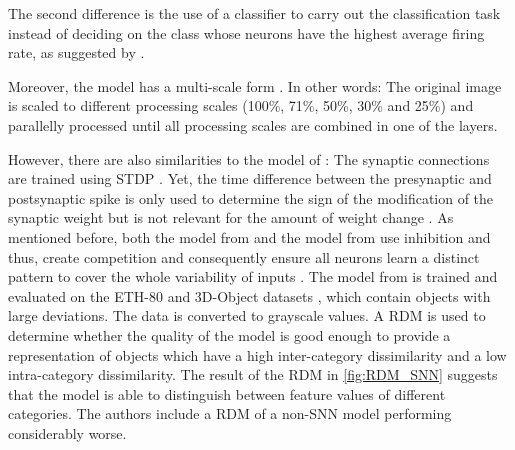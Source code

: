 The second difference is the use of a classifier to carry out the classification task 
instead of deciding on the class whose neurons have the highest average firing rate, 
as suggested by \authorsSNN{} \cite{SNN}.

Moreover, the model has a multi-scale form \cite{multi_scale_STDP}.
In other words: 
The original image is scaled to different processing scales (100\%, 71\%, 50\%, 30\% and 25\%) and parallelly processed until 
all processing scales are combined in one of the layers.

However, there are also similarities to the model of \authorsSNN{} \cite{SNN}:
The synaptic connections are trained using \ac{STDP} \cite{multi_scale_STDP,STDP_vis_feat}.
Yet, the time difference between the presynaptic and postsynaptic spike is only used to determine the sign of the modification of the synaptic weight 
but is not relevant for the amount of weight change \cite{STDP_vis_feat}.
As mentioned before, both the model from \authorsmultiScaleSTDP{} \cite{multi_scale_STDP} and the model from \authorsSNN{} \cite{SNN} use inhibition and thus, 
create competition and consequently ensure all neurons learn a distinct pattern to cover the whole variability of inputs \cite{STDP_vis_feat}.
%
The model from \authorsmultiScaleSTDP{} \cite{multi_scale_STDP} is trained and evaluated on the ETH-80 and 3D-Object datasets \cite{multi_scale_STDP}, which contain objects with large deviations.
The data is converted to grayscale values.
A \ac{RDM} is used to determine whether the quality of the model is good enough to provide a representation of objects which have a high inter-category dissimilarity and a low intra-category dissimilarity.
The result of the \ac{RDM} in \autoref{fig:RDM_SNN} suggests that the model is able to distinguish between feature values of different categories.
The authors include a \ac{RDM} of a non-\ac{SNN} model performing considerably worse.
%
